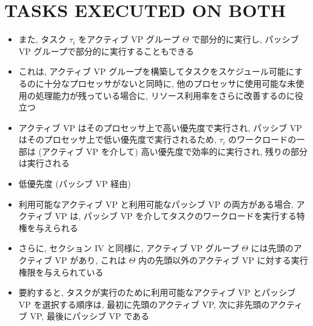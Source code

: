 
\section{TASKS EXECUTED ON BOTH}
\label{sec: tasks executed on both}

\begin{frame}{}
    \begin{itemize}
        \item また, タスク $\tau_{i}$ をアクティブ VP グループ $\Theta$ で部分的に実行し, パッシブ VP グループで部分的に実行することもできる
        \item これは, アクティブ VP グループを構築してタスクをスケジュール可能にするのに十分なプロセッサがないと同時に, 他のプロセッサに使用可能な未使用の処理能力が残っている場合に, リソース利用率をさらに改善するのに役立つ
        \item アクティブ VP はそのプロセッサ上で高い優先度で実行され, パッシブ VP はそのプロセッサ上で低い優先度で実行されるため, $\tau_{i}$ のワークロードの一部は (アクティブ VP を介して) 高い優先度で効率的に実行され, 残りの部分は実行される
        \item 低優先度 (パッシブ VP 経由)
    \end{itemize}
\end{frame}

\begin{frame}{}
    \begin{itemize}
        \item 利用可能なアクティブ VP と利用可能なパッシブ VP の両方がある場合, アクティブ VP は, パッシブ VP を介してタスクのワークロードを実行する特権を与えられる
        \item さらに, セクション IV と同様に, アクティブ VP グループ $\Theta$ には先頭のアクティブ VP があり, これは $\Theta$ 内の先頭以外のアクティブ VP に対する実行権限を与えられている
        \item 要約すると, タスクが実行のために利用可能なアクティブ VP とパッシブ VP を選択する順序は, 最初に先頭のアクティブ VP, 次に非先頭のアクティブ VP, 最後にパッシブ VP である
    \end{itemize}
\end{frame}

